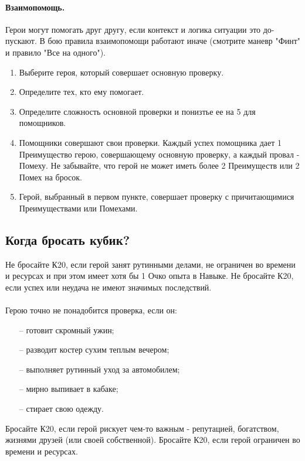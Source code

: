 \paragraph{Взаимопомощь.} Герои могут помогать друг другу, если контекст и логика ситуации это до-пускают. В бою правила взаимопомощи работают иначе (смотрите маневр "Финт" и правило "Все на одного").
\begin{enumerate}
    \item Выберите героя, который совершает основную проверку.
    \item Определите тех, кто ему помогает. 
    \item Определите сложность основной проверки и понизтье ее на 5 для помощников. 
    \item Помощники совершают свои проверки. Каждый успех помощника дает 1 Преимущество герою, совершающему основную проверку, а каждый провал - Помеху. Не забывайте, что герой не может иметь более 2 Преимуществ или 2 Помех на бросок.
    \item Герой, выбранный в первом пункте, совершает проверку с причитающимися Преимуществами или Помехами. 
\end{enumerate}

\subsection{Когда бросать кубик?}
Не бросайте К20, если герой занят рутинными делами, не ограничен во времени и ресурсах и при этом имеет хотя бы 1 Очко опыта в Навыке. Не бросайте К20, если успех или неудача не имеют значимых последствий.
\paragraph{}Герою точно не понадобится проверка, если он:
\begin{itemize}
\item[--]готовит скромный ужин;
\item[--]разводит костер сухим теплым вечером;
\item[--]выполняет рутинный уход за автомобилем;
\item[--]мирно выпивает в кабаке;
\item[--]стирает свою одежду.
\end{itemize}

Бросайте К20, если герой рискует чем-то важным - репутацией, богатством, жизнями друзей (или своей собственной). Бросайте К20, если герой ограничен во времени и ресурсах.
